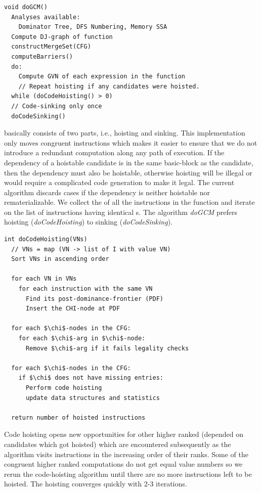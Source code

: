 \documentclass[sigplan,10pt,review,anonymous]{acmart}\settopmatter{printfolios=true,printccs=false,printacmref=false}
\begin{document}
\begin{lstlisting}
void doGCM()
  Analyses available:
    Dominator Tree, DFS Numbering, Memory SSA
  Compute DJ-graph of function
  constructMergeSet(CFG)
  computeBarriers()
  do:
    Compute GVN of each expression in the function
    // Repeat hoisting if any candidates were hoisted.
  while (doCodeHoisting() > 0)
  // Code-sinking only once
  doCodeSinking()
\end{lstlisting}


\GCM{} basically consists of two parts, i.e., hoisting and sinking. This
implementation only moves congruent instructions which makes it easier to ensure
that we do not introduce a redundant computation along any path of execution. If
the dependency of a hoistable candidate is in the same basic-block as the
candidate, then the dependency must also be hoistable, otherwise hoisting will
be illegal or would require a complicated code generation to make it legal. The
current algorithm discards cases if the dependency is neither hoistable nor
rematerializable. We collect the \GVN{} of all the instructions in the function
and iterate on the list of instructions having identical \GVN{}s. The algorithm
\emph{doGCM} prefers hoisting (\emph{doCodeHoisting}) to sinking
(\emph{doCodeSinking}).

\begin{lstlisting}
int doCodeHoisting(VNs)
  // VNs = map (VN -> list of I with value VN)
  Sort VNs in ascending order

  for each VN in VNs
    for each instruction with the same VN
      Find its post-dominance-frontier (PDF)
      Insert the CHI-node at PDF

  for each $\chi$-nodes in the CFG:
    for each $\chi$-arg in $\chi$-node:
      Remove $\chi$-arg if it fails legality checks

  for each $\chi$-nodes in the CFG:
    if $\chi$ does not have missing entries:
      Perform code hoisting
      update data structures and statistics

  return number of hoisted instructions
\end{lstlisting}


Code hoisting opens new opportunities for other higher ranked
\cite{rosen1988global} (depended on candidates which got hoisted) which are
encountered subsequently as the algorithm visits instructions in the increasing
order of their ranks. Some of the congruent higher ranked computations do not
get equal value numbers so we rerun the code-hoisting algorithm until there are
no more instructions left to be hoisted. The hoisting converges quickly with 2-3
iterations.
\end{document}
